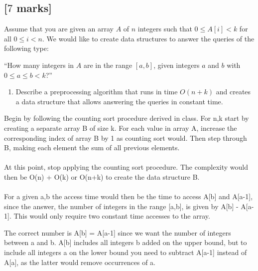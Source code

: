\documentclass[12pt]{article}
\begin{document}
\subsection{[$7$ marks]}

Assume that you are given an array $A$ of $n$ integers such that $0 \leq A [i]
< k$ for all $0 \leq i < n$. We would like to create data structures to answer
the queries of the following type:

\begin{center}
  ``How many integers in $A$ are in the range $[a, b]$, given integers $a$ and
  $b$ with $0 \leq a \leq b < k$?'' 
\end{center}
\begin{enumerate}
  \item Describe a preprocessing algorithm that runs in time $O (n + k)$ and
  creates a data structure that allows answering the queries in constant time.
\end{enumerate}

Begin by following the counting sort procedure derived in class. For n,k start by creating a separate array B of size k. For each value in array A, increase the corresponding index of array B by 1 as counting sort would. Then step through B, making each element the sum of all previous elements.\\\\

At this point, stop applying the counting sort procedure. The complexity would then be O(n) + O(k) or O(n+k) to create the data structure B.\\\\

For a given a,b the access time would then be the time to access A[b] and A[a-1], since the answer, the number of integers in the range [a,b], is given by A[b] - A[a-1]. This would only require two constant time accesses to the array.

The correct number is A[b] = A[a-1] since we want the number of integers between a and b. A[b] includes all integers b added on the upper bound, but to include all integers a on the lower bound you need to subtract A[a-1] instead of A[a], as the latter would remove occurrences of a.
\end{document}
